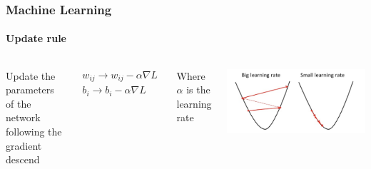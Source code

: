 \documentclass[aspectratio=43]{beamer}
\begin{document}
\begin{frame}

	\frametitle{Machine Learning}
	\framesubtitle{Update rule}
	
	\begin{columns}
		
		
		Update the parameters of the network following the gradient descend
		
		\begin{align}
			w_{ij} \longrightarrow w_{ij} - \alpha \nabla L \nonumber \\
			b_{i} \longrightarrow b_{i} - \alpha \nabla L  \nonumber
		\end{align}
		
		Where $\alpha$ is the learning rate
		
		
		\includegraphics[width = 1.25 \linewidth]{loss2.png}
		
	\end{columns}

\end{frame}

\begin{frame}


\end{frame}
\end{document}
